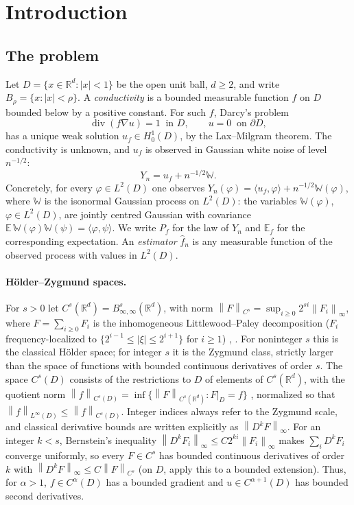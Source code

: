 \documentclass[11pt]{article}
\numberwithin{equation}{section}
\newcommand{\R}{\mathbb R}
\newcommand{\E}{\mathbb E}
\newcommand{\norm}[1]{\left\|#1\right\|}
\newcommand{\diver}{\operatorname{div}}
\begin{document}
\section{Introduction}

\subsection{The problem}

Let $D=\{x\in\R^d:|x|<1\}$ be the open unit ball, $d\ge2$, and write
$B_\rho=\{x:|x|<\rho\}$. A \emph{conductivity} is a bounded measurable
function $f$ on $D$ bounded below by a positive constant. For such
$f$, Darcy's problem
\begin{equation}\label{eq:pde}
 \diver(f\nabla u)=1\ \text{ in }D,\qquad u=0\ \text{ on }\partial D,
\end{equation}
has a unique weak solution $u_f\in H^1_0(D)$, by the Lax--Milgram
theorem. The conductivity is unknown, and $u_f$ is observed in Gaussian
white noise of level $n^{-1/2}$:
\begin{equation}\label{eq:model}
 Y_n=u_f+n^{-1/2}\mathbb W .
\end{equation}
Concretely, for every $\varphi\in L^2(D)$ one observes
$Y_n(\varphi)=\langle u_f,\varphi\rangle+n^{-1/2}\mathbb W(\varphi)$,
where $\mathbb W$ is the isonormal Gaussian process on $L^2(D)$: the
variables $\mathbb W(\varphi)$, $\varphi\in L^2(D)$, are jointly
centred Gaussian with covariance
$\E\,\mathbb W(\varphi)\mathbb W(\psi)=\langle\varphi,\psi\rangle$.
We write $P_f$ for the law of $Y_n$ and $\E_f$ for the corresponding
expectation. An \emph{estimator} $\widehat f_n$ is any measurable
function of the observed process with values in $L^2(D)$.

\paragraph{H\"older--Zygmund spaces.}
For $s>0$ let $C^s(\R^d)=B^s_{\infty,\infty}(\R^d)$, with norm
$\norm F_{C^s}=\sup_{i\ge0}2^{si}\norm{F_i}_\infty$, where
$F=\sum_{i\ge0}F_i$ is the inhomogeneous Littlewood--Paley
decomposition ($F_i$ frequency-localized to
$\{2^{i-1}\le|\xi|\le2^{i+1}\}$ for $i\ge1$) \cite[Section 4.3]{GN},
\cite{Triebel}. For noninteger $s$ this is the classical H\"older
space; for integer $s$ it is the Zygmund class, strictly larger than
the space of functions with bounded continuous derivatives of order
$s$. The space $C^s(D)$ consists of the restrictions to $D$ of elements
of $C^s(\R^d)$, with the quotient norm
$\norm f_{C^s(D)}=\inf\{\norm F_{C^s(\R^d)}:F|_D=f\}$
\cite[Section 4.3.6]{GN}, normalized so that
$\norm f_{L^\infty(D)}\le\norm f_{C^s(D)}$. Integer indices always
refer to the Zygmund scale, and classical derivative bounds are written
explicitly as $\norm{D^kF}_\infty$. For an integer $k<s$, Bernstein's
inequality $\norm{D^kF_i}_\infty\le C2^{ki}\norm{F_i}_\infty$
\cite[Lemma 4.3.4]{GN} makes $\sum_iD^kF_i$ converge uniformly, so
every $F\in C^s$ has bounded continuous derivatives of order $k$ with
$\norm{D^kF}_\infty\le C\norm F_{C^s}$ (on $D$, apply this to a bounded
extension). Thus, for $\alpha>1$, $f\in C^\alpha(D)$ has a bounded
gradient and $u\in C^{\alpha+1}(D)$ has bounded second derivatives.
\end{document}
